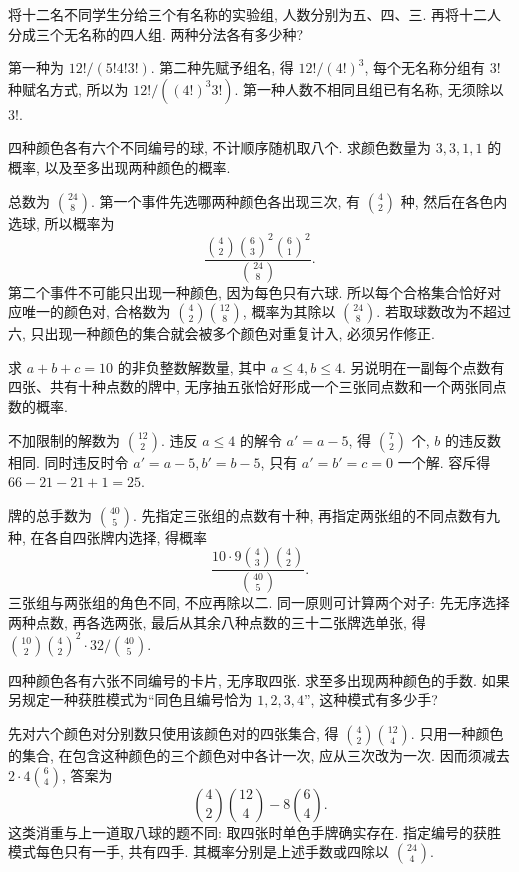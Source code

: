 \begin{exercise}
将十二名不同学生分给三个有名称的实验组, 人数分别为五、四、三. 再将十二人分成三个无名称的四人组. 两种分法各有多少种?
\end{exercise}
\begin{solution}
第一种为 $12!/(5!4!3!)$. 第二种先赋予组名, 得 $12!/(4!)^3$, 每个无名称分组有 $3!$ 种赋名方式, 所以为 $12!/((4!)^3 3!)$. 第一种人数不相同且组已有名称, 无须除以 $3!$.
\end{solution}

\begin{exercise}
四种颜色各有六个不同编号的球, 不计顺序随机取八个. 求颜色数量为 $3,3,1,1$ 的概率, 以及至多出现两种颜色的概率.
\end{exercise}
\begin{solution}
总数为 $\binom{24}{8}$. 第一个事件先选哪两种颜色各出现三次, 有 $\binom42$ 种, 然后在各色内选球, 所以概率为
\[
 \frac{\binom42\binom63^2\binom61^2}{\binom{24}{8}}.
\]
第二个事件不可能只出现一种颜色, 因为每色只有六球. 所以每个合格集合恰好对应唯一的颜色对, 合格数为 $\binom42\binom{12}{8}$, 概率为其除以 $\binom{24}{8}$. 若取球数改为不超过六, 只出现一种颜色的集合就会被多个颜色对重复计入, 必须另作修正.
\end{solution}

\begin{exercise}
求 $a+b+c=10$ 的非负整数解数量, 其中 $a\leq4,b\leq4$. 另说明在一副每个点数有四张、共有十种点数的牌中, 无序抽五张恰好形成一个三张同点数和一个两张同点数的概率.
\end{exercise}
\begin{solution}
不加限制的解数为 $\binom{12}{2}$. 违反 $a\leq4$ 的解令 $a'=a-5$, 得 $\binom72$ 个, $b$ 的违反数相同. 同时违反时令 $a'=a-5,b'=b-5$, 只有 $a'=b'=c=0$ 一个解. 容斥得 $66-21-21+1=25$.

牌的总手数为 $\binom{40}{5}$. 先指定三张组的点数有十种, 再指定两张组的不同点数有九种, 在各自四张牌内选择, 得概率
\[
 \frac{10\cdot9\binom43\binom42}{\binom{40}{5}}.
\]
三张组与两张组的角色不同, 不应再除以二. 同一原则可计算两个对子: 先无序选择两种点数, 再各选两张, 最后从其余八种点数的三十二张牌选单张, 得 $\binom{10}{2}\binom42^2\cdot32/\binom{40}{5}$.
\end{solution}

\begin{exercise}
四种颜色各有六张不同编号的卡片, 无序取四张. 求至多出现两种颜色的手数. 如果另规定一种获胜模式为``同色且编号恰为 $1,2,3,4$'', 这种模式有多少手?
\end{exercise}
\begin{solution}
先对六个颜色对分别数只使用该颜色对的四张集合, 得 $\binom42\binom{12}{4}$. 只用一种颜色的集合, 在包含这种颜色的三个颜色对中各计一次, 应从三次改为一次. 因而须减去 $2\cdot4\binom64$, 答案为
\[
 \binom42\binom{12}{4}-8\binom64.
\]
这类消重与上一道取八球的题不同: 取四张时单色手牌确实存在. 指定编号的获胜模式每色只有一手, 共有四手. 其概率分别是上述手数或四除以 $\binom{24}{4}$.
\end{solution}
